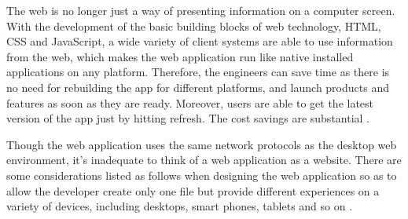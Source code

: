The web is no longer just a way of presenting information on a computer screen. With the development of the basic building blocks of web technology, HTML, CSS and JavaScript, a wide variety of client systems are able to use information from the web, which makes the web application run like native installed applications on any platform. Therefore, the engineers can save time as there is no need for rebuilding the app for different platforms, and launch products and features as soon as they are ready. Moreover, users are able to get the latest version of the app just by hitting refresh. The cost savings are substantial \cite{taivalsaari2011web}.

Though the web application uses the same network protocols as the desktop web environment, it's inadequate to think of a web application as a website. There are some considerations listed as follows when designing the web application so as to allow the developer create only one file but provide different experiences on a variety of devices, including desktops, smart phones, tablets and so on \cite{firtman2010programming}.


